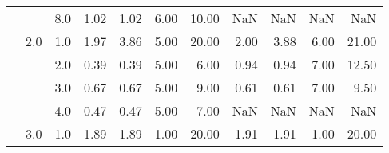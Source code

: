 \begin{tabular}{lllrrrrrrrr}
       &     & 8.0  &       1.02 &      1.02 & 6.00 &  10.00 &        NaN &       NaN &  NaN &    NaN \\
       & 2.0 & 1.0  &       1.97 &      3.86 & 5.00 &  20.00 &       2.00 &      3.88 & 6.00 &  21.00 \\
       &     & 2.0  &       0.39 &      0.39 & 5.00 &   6.00 &       0.94 &      0.94 & 7.00 &  12.50 \\
       &     & 3.0  &       0.67 &      0.67 & 5.00 &   9.00 &       0.61 &      0.61 & 7.00 &   9.50 \\
       &     & 4.0  &       0.47 &      0.47 & 5.00 &   7.00 &        NaN &       NaN &  NaN &    NaN \\
       & 3.0 & 1.0  &       1.89 &      1.89 & 1.00 &  20.00 &       1.91 &      1.91 & 1.00 &  20.00 \\
\bottomrule
\end{tabular}
